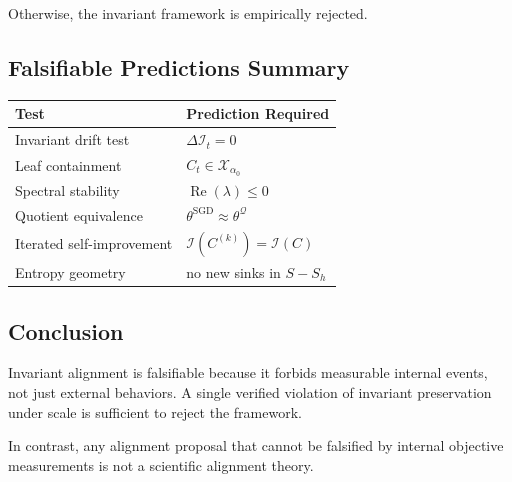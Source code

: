 \documentclass[11pt,a4paper]{article}
\theoremstyle{plain}
\theoremstyle{definition}
\theoremstyle{remark}
\numberwithin{equation}{section}
\begin{document}
Otherwise, the invariant framework is empirically rejected.

\subsection{Falsifiable Predictions Summary}

\begin{table}[H]
\centering
\begin{tabular}{l l}
\toprule
Test & Prediction Required \\
\midrule
Invariant drift test & $\Delta \mathcal{I}_t = 0$ \\
Leaf containment & $C_t \in \mathcal{X}_{\alpha_0}$ \\
Spectral stability & $\operatorname{Re}(\lambda) \le 0$ \\
Quotient equivalence & $\theta^{\text{SGD}} \approx \theta^{\mathcal{Q}}$ \\
Iterated self-improvement & $\mathcal{I}(C^{(k)}) = \mathcal{I}(C)$ \\
Entropy geometry & no new sinks in $S - S_h$ \\
\bottomrule
\end{tabular}
\end{table}

\subsection{Conclusion}

Invariant alignment is falsifiable because it forbids measurable internal events, not just external behaviors.  
A single verified violation of invariant preservation under scale is sufficient to reject the framework.

In contrast, any alignment proposal that cannot be falsified by internal objective measurements is not a scientific alignment theory.
\end{document}
